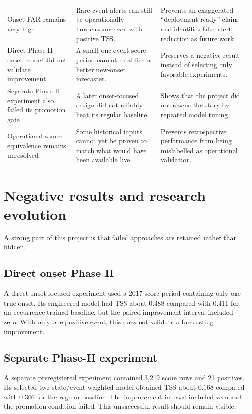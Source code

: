 \documentclass[11pt]{article}
\begin{document}
\begin{longtable}{p{}p{}p{}}
\addlinespace
Onset FAR remains very high & Rare-event alerts can still be operationally burdensome even with positive TSS. & Prevents an exaggerated ``deployment-ready'' claim and identifies false-alert reduction as future work. \\
\addlinespace
Direct Phase-II onset model did not validate improvement & A small one-event score period cannot establish a better new-onset forecaster. & Preserves a negative result instead of selecting only favorable experiments. \\
\addlinespace
Separate Phase-II experiment also failed its promotion gate & A later onset-focused design did not reliably beat its regular baseline. & Shows that the project did not rescue the story by repeated model tuning. \\
\addlinespace
Operational-source equivalence remains unresolved & Some historical inputs cannot yet be proven to match what would have been available live. & Prevents retrospective performance from being mislabelled as operational validation. \\
\bottomrule
\end{longtable}

\section{Negative results and research evolution}

A strong part of this project is that failed approaches are retained rather than hidden.

\subsection{Direct onset Phase II}

A direct onset-focused experiment used a 2017 score period containing only one true onset. Its engineered model had TSS about 0.488 compared with 0.411 for an occurrence-trained baseline, but the paired improvement interval included zero. With only one positive event, this does not validate a forecasting improvement.

\subsection{Separate Phase-II experiment}

A separate preregistered experiment contained 3,219 score rows and 21 positives. Its selected two-state/event-weighted model obtained TSS about 0.168 compared with 0.366 for the regular baseline. The improvement interval included zero and the promotion condition failed. This unsuccessful result should remain visible.
\end{document}
